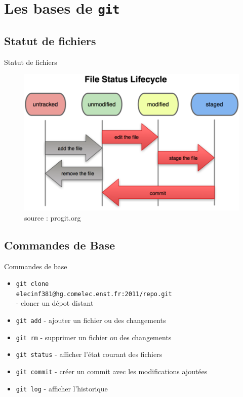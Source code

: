\documentclass{beamer}
\newcommand{\git}{\texttt{git}\xspace}
\begin{document}
\section{Les bases de \git}
\subsection*{Statut de fichiers}
\begin{frame}{Statut de fichiers}
  \begin{figure}
    \begin{center}
      \includegraphics[scale=0.7]{img/Status_lifecycle.png}
    \end{center}
    \caption{source : progit.org}
  \end{figure}
\end{frame}

\subsection*{Commandes de Base}
\begin{frame}[containsverbatim]{Commandes de base}
  \begin{itemize}
  \item \lstinline|git clone| \\
    \lstinline|elecinf381@hg.comelec.enst.fr:2011/repo.git| \\
    - cloner un dépot distant
  \item \lstinline|git add| - ajouter un fichier ou des changements
  \item \lstinline|git rm| - supprimer un fichier ou des changements
  \item \lstinline|git status| - afficher l'état courant des fichiers
  \item \lstinline|git commit| - créer un commit avec les modifications ajoutées
  \item \lstinline|git log| - afficher l'historique
  \end{itemize}
\end{frame}
\end{document}
